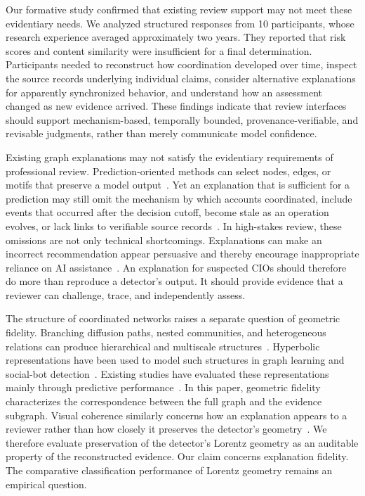 Our formative study confirmed that existing review support may not meet these evidentiary needs. We analyzed structured responses from 10 participants, whose research experience averaged approximately two years. They reported that risk scores and content similarity were insufficient for a final determination. Participants needed to reconstruct how coordination developed over time, inspect the source records underlying individual claims, consider alternative explanations for apparently synchronized behavior, and understand how an assessment changed as new evidence arrived. These findings indicate that review interfaces should support mechanism-based, temporally bounded, provenance-verifiable, and revisable judgments, rather than merely communicate model confidence.

Existing graph explanations may not satisfy the evidentiary requirements of professional review. Prediction-oriented methods can select nodes, edges, or motifs that preserve a model output~\cite{agarwal2023evaluating,chen2023tempme}. Yet an explanation that is sufficient for a prediction may still omit the mechanism by which accounts coordinated, include events that occurred after the decision cutoff, become stale as an operation evolves, or lack links to verifiable source records~\cite{agarwal2023evaluating,wang2024humanexplain}. In high-stakes review, these omissions are not only technical shortcomings. Explanations can make an incorrect recommendation appear persuasive and thereby encourage inappropriate reliance on AI assistance~\cite{schemmer2023appropriate,he2023knowing,schoeffer2024explanations}. An explanation for suspected CIOs should therefore do more than reproduce a detector's output. It should provide evidence that a reviewer can challenge, trace, and independently assess.

The structure of coordinated networks raises a separate question of geometric fidelity. Branching diffusion paths, nested communities, and heterogeneous relations can produce hierarchical and multiscale structures~\cite{choudhary2023hyperbolic,yang2024hypformer,park2024hyperbolic,park2024multihyperbolic}. Hyperbolic representations have been used to model such structures in graph learning and social-bot detection~\cite{choudhary2023hyperbolic,lu2026sahg}. Existing studies have evaluated these representations mainly through predictive performance~\cite{choudhary2023hyperbolic,yang2024hypformer,lu2026sahg}. In this paper, geometric fidelity characterizes the correspondence between the full graph and the evidence subgraph. Visual coherence similarly concerns how an explanation appears to a reviewer rather than how closely it preserves the detector's geometry~\cite{wang2024humanexplain}. We therefore evaluate preservation of the detector's Lorentz geometry as an auditable property of the reconstructed evidence. Our claim concerns explanation fidelity. The comparative classification performance of Lorentz geometry remains an empirical question.

